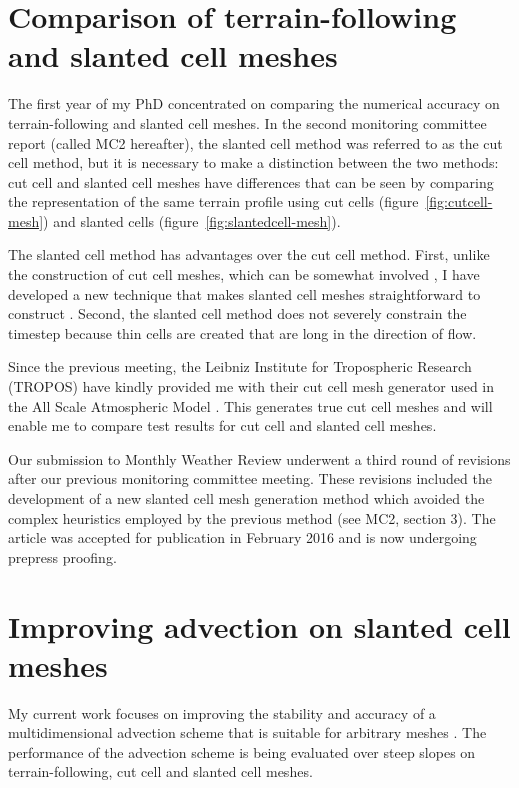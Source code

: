 \documentclass[a4paper,11pt]{article}
\begin{document}
\section{Comparison of terrain-following and slanted cell meshes}
The first year of my PhD concentrated on comparing the numerical accuracy on terrain-following and slanted cell meshes.
In the second monitoring committee report (called MC2 hereafter), the slanted cell method was referred to as the cut cell method, but it is necessary to make a distinction between the two methods: cut cell and slanted cell meshes have differences that can be seen by comparing the representation of the same terrain profile using cut cells (figure~\ref{fig:cutcell-mesh}) and slanted cells (figure~\ref{fig:slantedcell-mesh}).

The slanted cell method has advantages over the cut cell method.  First, unlike the construction of cut cell meshes, which can be somewhat involved \citep{hartkopf2011}, I have developed a new technique that makes slanted cell meshes straightforward to construct \citep{shaw-weller2016}.  Second, the slanted cell method does not severely constrain the timestep because thin cells are created that are long in the direction of flow.

Since the previous meeting, the Leibniz Institute for Tropospheric Research (TROPOS) have kindly provided me with their cut cell mesh generator used in the All Scale Atmospheric Model \citep{jaehn2015}.  This generates true cut cell meshes and will enable me to compare test results for cut cell and slanted cell meshes.

Our submission to Monthly Weather Review underwent a third round of revisions after our previous monitoring committee meeting.  These revisions included the development of a new slanted cell mesh generation method which avoided the complex heuristics employed by the previous method (see MC2, section 3).  The article was accepted for publication in February 2016 and is now undergoing prepress proofing.

\section{Improving advection on slanted cell meshes}
My current work focuses on improving the stability and accuracy of a multidimensional advection scheme that is suitable for arbitrary meshes \citep{weller-shahrokhi2014}.  The performance of the advection scheme is being evaluated over steep slopes on terrain-following, cut cell and slanted cell meshes.
\end{document}
